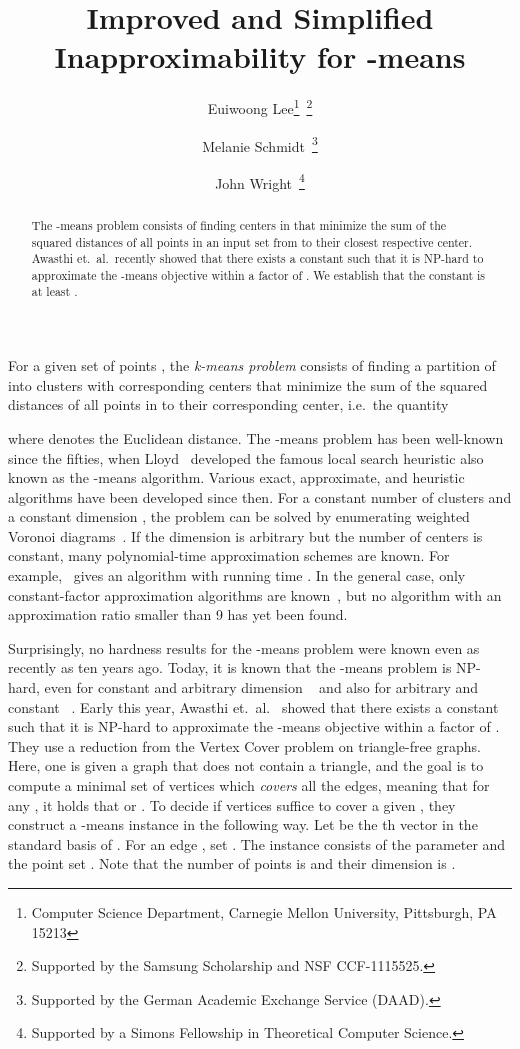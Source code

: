 \documentclass{scrartcl}
\begin{document}
\title{Improved and Simplified Inapproximability for -means}
\author{Euiwoong Lee\thanks{Computer Science Department, Carnegie Mellon University, Pittsburgh, PA 15213}~\thanks{Supported by the Samsung Scholarship and NSF CCF-1115525.} \and Melanie Schmidt\footnotemark[1]~\thanks{Supported by the German Academic Exchange Service (DAAD).} \and John Wright\footnotemark[1]~\thanks{Supported by a Simons Fellowship in Theoretical Computer Science.}}




\maketitle
\begin{abstract}
The -means problem consists of finding  centers in  that minimize the sum of the squared distances of all points in an input set  from  to their closest respective center. 
Awasthi et.\ al.\ recently showed that there exists a constant  such that it is NP-hard to approximate the -means objective within a factor of . We establish that the constant  is at least . 
\end{abstract}

For a given set of points , the \emph{k-means problem} consists of finding a partition of  into  clusters  with corresponding centers  that minimize the sum of the squared distances of all points in  to their corresponding center, i.e.\ the quantity

where  denotes the Euclidean distance.
The -means problem has been well-known since the fifties, when Lloyd~\cite{L57} developed the famous local search heuristic also known as the -means algorithm. Various exact, approximate, and heuristic algorithms have been developed since then. For a constant number of clusters  and a constant dimension , the problem can be solved by enumerating weighted Voronoi diagrams~\cite{IKI94}. If the dimension is arbitrary but the number of centers is constant, many polynomial-time approximation schemes are known. For example,~\cite{FL11} gives an algorithm with running time . In the general case, only constant-factor approximation algorithms are known~\cite{JV01,KMNPSW04}, but no algorithm with an approximation ratio smaller than 9 has yet been found.

Surprisingly, no hardness results for the -means problem were known even as recently as ten years ago. Today, it is known that the -means problem is NP-hard, even for constant  and arbitrary dimension ~\cite{ADHP09,D08} and also for arbitrary  and constant ~\cite{MNV09}. Early this year, Awasthi et.\ al.~\cite{ACKS15} showed that there exists a constant  such that it is NP-hard to approximate the -means objective within a factor of . They use a reduction from the Vertex Cover problem on triangle-free graphs.  Here, one is given a graph  that does not contain a triangle, and the goal is to compute a minimal set of vertices  which \emph{covers} all the edges, meaning that for any , it holds that  or .
To decide if  vertices suffice to cover a given , they construct a -means instance in the following way. Let  be the th vector in the standard basis of . For an edge , set . The instance consists of the parameter  and the point set . Note that the number of points is  and their dimension is . 
\end{document}
